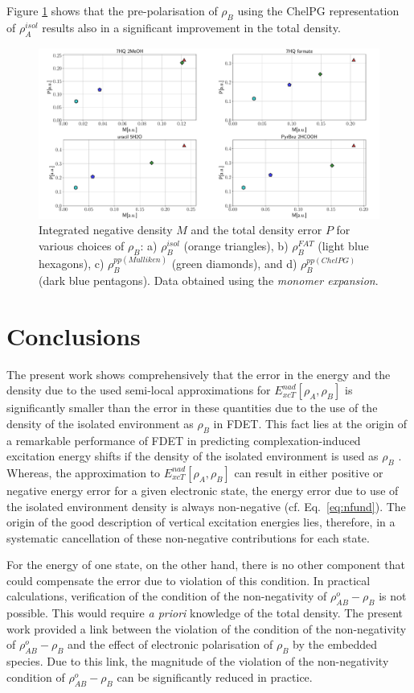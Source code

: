 \documentclass[amsmath,amssymb,preprint,aip,jcp]{revtex4-1}
\begin{document}
Figure \ref{fig:M_vs_P} shows that the pre-polarisation of $\rho_B$ using the ChelPG representation of $\rho_A^{isol}$
results also in a significant improvement in the total density.
\begin{figure}
\centering
\includegraphics[width=1.0\linewidth]{M_vs_P.pdf}
\caption{Integrated negative density $M$ and the total density error $P$ for various choices of $\rho_B$: a) $\rho_B^{isol}$ (orange triangles), b) $\rho_B^{FAT}$ (light blue hexagons), c) $\rho_B^{pp(Mulliken)}$ (green diamonds), and d) $\rho_B^{pp(ChelPG)}$ (dark blue pentagons). Data obtained using the {\it monomer expansion}.}
\label{fig:M_vs_P}
\end{figure}
\section{Conclusions}
The present work shows comprehensively that the error in the energy and the density due to the used semi-local approximations for 
${E}_{xcT}^{nad}[\rho_A,\rho_B]$ is significantly smaller than the error in these quantities due to the use of the density of the isolated environment as $\rho_B$ in FDET. 
This fact lies at the origin of a remarkable performance of FDET in predicting complexation-induced excitation energy shifts  if the density of the isolated environment is used as $\rho_B$ \cite{Ricardi2018}.
Whereas, the approximation to ${E}_{xcT}^{nad}[\rho_A,\rho_B]$ can result in either positive or negative energy error for a given electronic state, the energy error due to  use of the isolated environment density is always non-negative (cf. Eq.~\ref{eq:nfund}). The origin of the good description of vertical excitation energies lies, therefore, in a systematic cancellation of these non-negative contributions for each state.

For the energy of one state, on the other hand, there is no other component that could compensate the error due to violation of this condition. In practical calculations, verification of the condition of the non-negativity of $\rho^{o}_{AB}-\rho_B$ is not possible. This would require \textit{a priori} knowledge of the total density.
The present work provided a link between the violation of the condition of the non-negativity of $\rho^{o}_{AB}-\rho_B$
and the effect of electronic polarisation of $\rho_B$ by the embedded species. Due to this link, the magnitude
of the violation of the non-negativity condition of $\rho^{o}_{AB}-\rho_B$ can be significantly reduced in practice.
\end{document}
